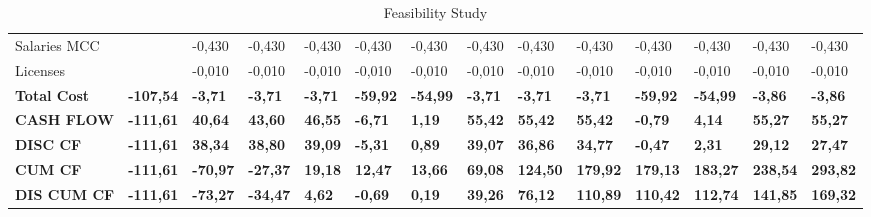 \begin{landscape}
\begin{table}[]
{\begin{tabular}{| l | l | l | l | l | l | l | l | l | l | l | l | l | l |}
Salaries MCC                                                                           &                  & -0,430          & -0,430          & -0,430          & -0,430          & -0,430          & -0,430          & -0,430          & -0,430          & -0,430          & -0,430           & -0,430           & -0,430           \\
Licenses                                                                               &                  & -0,010          & -0,010          & -0,010          & -0,010          & -0,010          & -0,010          & -0,010          & -0,010          & -0,010          & -0,010           & -0,010           & -0,010           \\
\textbf{Total Cost}                                                                    & \textbf{-107,54} & \textbf{-3,71}  & \textbf{-3,71}  & \textbf{-3,71}  & \textbf{-59,92} & \textbf{-54,99} & \textbf{-3,71}  & \textbf{-3,71}  & \textbf{-3,71}  & \textbf{-59,92} & \textbf{-54,99}  & \textbf{-3,86}   & \textbf{-3,86}   
\\ \hline \hline
\rowcolor[gray]{0.85}
\textbf{CASH FLOW}                                                                     & \textbf{-111,61} & \textbf{40,64}  & \textbf{43,60}  & \textbf{46,55}  & \textbf{-6,71}  & \textbf{1,19}   & \textbf{55,42}  & \textbf{55,42}  & \textbf{55,42}  & \textbf{-0,79}  & \textbf{4,14}    & \textbf{55,27}   & \textbf{55,27}   \\
\rowcolor[gray]{0.85}
\textbf{DISC CF}                                                                       & \textbf{-111,61} & \textbf{38,34}  & \textbf{38,80}  & \textbf{39,09}  & \textbf{-5,31}  & \textbf{0,89}   & \textbf{39,07}  & \textbf{36,86}  & \textbf{34,77}  & \textbf{-0,47}  & \textbf{2,31}    & \textbf{29,12}   & \textbf{27,47}   \\
\rowcolor[gray]{0.85}
\textbf{CUM CF}                                                                        & \textbf{-111,61} & \textbf{-70,97} & \textbf{-27,37} & \textbf{19,18}  & \textbf{12,47}  & \textbf{13,66}  & \textbf{69,08}  & \textbf{124,50} & \textbf{179,92} & \textbf{179,13} & \textbf{183,27}  & \textbf{238,54}  & \textbf{293,82}  \\
\rowcolor[gray]{0.85}
\textbf{DIS CUM CF}                                                                    & \textbf{-111,61} & \textbf{-73,27} & \textbf{-34,47} & \textbf{4,62}   & \textbf{-0,69}  & \textbf{0,19}   & \textbf{39,26}  & \textbf{76,12}  & \textbf{110,89} & \textbf{110,42} & \textbf{112,74}  & \textbf{141,85}  & \textbf{169,32} 
\\ \hline
\end{tabular}
}
\vspace*{\fill}
\caption{Feasibility Study}
\label{Feasibility Study}
\end{table}
\end{landscape}
